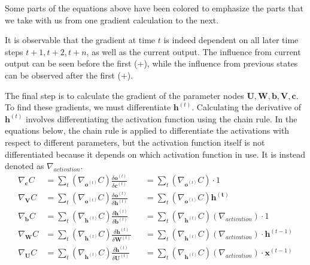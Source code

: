 \documentclass[12pt]{article}
\begin{document}
Some parts of the equations above have been colored to emphasize the parts that we take with us from one gradient calculation to the next. \par
It is observable that the gradient at time $t$ is indeed dependent on all later time steps $t + 1, t + 2, t + n$, as well as the current output. The influence from current output can be seen before the first (+), while the influence from previous states can be observed after the first (+). \par

The final step is to calculate the gradient of the parameter nodes $\mathbf{U, W, b, V, c}$. To find these gradients, we must differentiate $\mathbf{h}^{(t)}$. Calculating the derivative of $\mathbf{h}^{(t)}$ involves differentiating the activation function using the chain rule. In the equations below, the chain rule is applied to differentiate the activations with respect to different parameters, but the activation function itself is not differentiated because it depends on which activation function in use. It is instead denoted as $\nabla_{activation}$.
\begin{align*}
    \nabla_\mathbf{c}C &= \sum_t \left(\nabla_{\mathbf{o}^{(t)}}C\right) \frac{\delta \mathbf{o}^{(t)}}{\delta \mathbf{c}^{(t)}} &&= \sum_t \left(\nabla_{\mathbf{o}^{(t)}}C\right) \cdot 1 \\
    \nabla_\mathbf{V}C &= \sum_t \left(\nabla_{\mathbf{o}^{(t)}}C\right) \frac{\delta \mathbf{o}^{(t)}}{\delta \mathbf{h}^{(t)}} &&= \sum_t \left(\nabla_{\mathbf{o}^{(t)}}C\right)\mathbf{h^{(t)}} \\
    \nabla_\mathbf{b}C &= \sum_t \left(\nabla_{\mathbf{h}^{(t)}}C\right) \frac{\delta \mathbf{h}^{(t)}}{\delta \mathbf{b}^{(t)}} &&= \sum_t \left(\nabla_{\mathbf{h}^{(t)}}C\right) \left(\nabla_{activation}\right) \cdot 1 \\
    \nabla_\mathbf{W}C &= \sum_t \left(\nabla_{\mathbf{h}^{(t)}}C\right) \frac{\delta \mathbf{h}^{(t)}}{\delta \mathbf{W}^{(t)}} &&= \sum_t \left(\nabla_{\mathbf{h}^{(t)}}C\right) \left(\nabla_{activation}\right) \cdot \mathbf{h}^{(t-1)} \\
    \nabla_\mathbf{U}C &= \sum_t \left(\nabla_{\mathbf{h}^{(t)}}C\right) \frac{\delta \mathbf{h}^{(t)}}{\delta \mathbf{U}^{(t)}} &&= \sum_t \left(\nabla_{\mathbf{h}^{(t)}}C\right) \left(\nabla_{activation}\right) \cdot \mathbf{x}^{(t-1)}\\
\end{align*}
\end{document}
